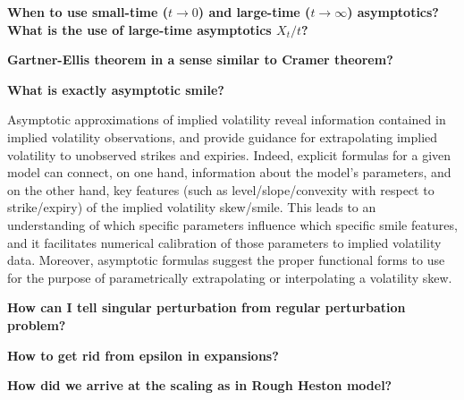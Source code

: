 \documentclass[12pt]{article}
\begin{document}
\textbf{When to use small-time ($t \rightarrow 0$) and large-time ($t \rightarrow \infty$) asymptotics? What is the use of large-time asymptotics $X_t / t$?}

\textbf{Gartner-Ellis theorem in a sense similar to Cramer theorem?}

\textbf{What is exactly asymptotic smile?}

Asymptotic approximations of implied volatility reveal information contained in implied volatility observations, and provide guidance for extrapolating implied volatility to unobserved strikes and expiries. Indeed, explicit formulas for a given model can connect, on one hand, information about the model’s parameters, and on the other hand, key features (such as level/slope/convexity with respect to strike/expiry) of the implied volatility skew/smile. This leads to an understanding of which specific parameters influence which specific smile features, and it facilitates numerical calibration of those parameters to implied volatility data. Moreover, asymptotic formulas suggest the proper functional forms to use for the purpose of parametrically extrapolating or interpolating a volatility skew.

\textbf{How can I tell singular perturbation from regular perturbation problem?}

\textbf{How to get rid from epsilon in expansions?}

\textbf{How did we arrive at the scaling as in Rough Heston model?}
\end{document}

